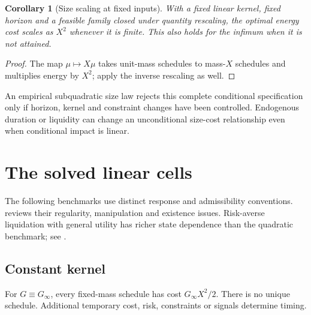 \documentclass[11pt]{article}
\numberwithin{equation}{section}
\newtheorem{corollary}[theorem]{Corollary}
\theoremstyle{definition}
\theoremstyle{remark}
\theoremstyle{definition}
\begin{document}
\begin{corollary}[Size scaling at fixed inputs]\label{cor:quadratic}
With a fixed linear kernel, fixed horizon and a feasible family closed under
quantity rescaling, the optimal energy cost scales as $X^2$ whenever it is
finite. This also holds for the infimum when it is not attained.
\end{corollary}
\begin{proof}
The map $\mu\mapsto X\mu$ takes unit-mass schedules to mass-$X$ schedules and
multiplies energy by $X^2$; apply the inverse rescaling as well.
\end{proof}
An empirical subquadratic size law rejects this complete conditional
specification only if horizon, kernel and constraint changes have been
controlled. Endogenous duration or liquidity can change an unconditional
size-cost relationship even when conditional impact is linear.

\section{The solved linear cells}\label{sec:solved}
The following benchmarks use distinct response and admissibility conventions.
\citet{gatheralschied2013survey} reviews their regularity, manipulation and
existence issues. Risk-averse liquidation with general utility has richer
state dependence than the quadratic benchmark; see
\citet{schiedschoeneborn2009}.
\subsection{Constant kernel}
For $G\equiv G_\infty$, every fixed-mass schedule has cost $G_\infty X^2/2$.
There is no unique schedule. Additional temporary cost, risk, constraints or
signals determine timing.
\end{document}
